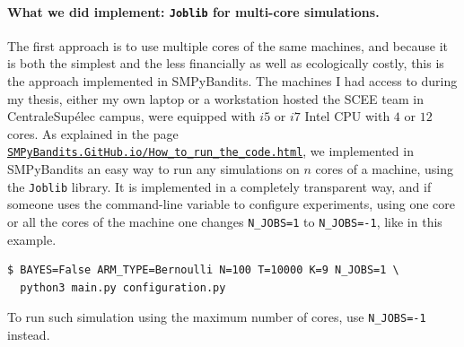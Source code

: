 \paragraph{What we did implement: \texttt{Joblib} for multi-core simulations.}
%
The first approach is to use multiple cores of the same machines, and because it is both the simplest and the less financially as well as ecologically costly, this is the approach implemented in SMPyBandits.
The machines I had access to during my thesis, either my own laptop or a workstation hosted the SCEE team in CentraleSupélec campus, were equipped with $i5$ or $i7$ Intel CPU with $4$ or $12$ cores.
%
As explained in the page \href{https://smpybandits.github.io/How_to_run_the_code.html}{\texttt{SMPyBandits.GitHub.io/How\_to\_run\_the\_code.html}}, we implemented in SMPyBandits an easy way to run any simulations on $n$ cores of a machine, using the \texttt{Joblib} \cite{joblib} library.
It is implemented in a completely transparent way, and if someone uses the command-line variable to configure experiments, using one core or all the cores of the machine one changes \texttt{N\_JOBS=1} to \texttt{N\_JOBS=-1}, like in this example.

\begin{small}
    \begin{listing}[h!]
        \begin{verbatim}
$ BAYES=False ARM_TYPE=Bernoulli N=100 T=10000 K=9 N_JOBS=1 \
  python3 main.py configuration.py
        \end{verbatim}
        \caption{To run such simulation using the maximum number of cores, use \texttt{N\_JOBS=-1} instead.}
        \label{lst:3:runOneCoreOrMore}
    \end{listing}
\end{small}


